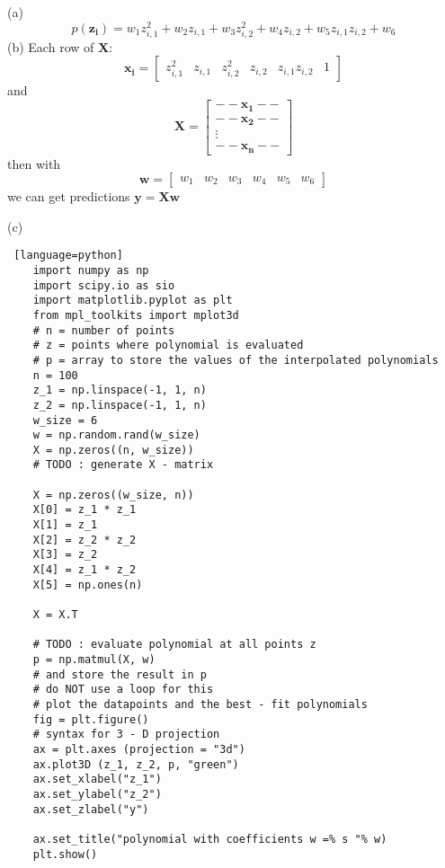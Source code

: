 \documentclass[a4paper, 12pt]{article}
\begin{document}
\begin{problem}

\end{problem}
\begin{solution}
    (a) \[
        p(\mathbf{z_i}) = w_1z_{i, 1}^2 + w_2 z_{i, 1} + w_3 z_{i, 2}^2 + w_4 z_{i, 2} + w_5 z_{i,1}z_{i,2} + w_6
    \]
    (b)
    Each row of $\mathbf{X}$:
    \[
        \mathbf{x_i} = \begin{bmatrix}
            z_{i, 1}^2 & z_{i, 1} & z_{i, 2}^2 & z_{i, 2} & z_{i,1}z_{i,2} & 1
        \end{bmatrix}
    \]
    and \[
    \mathbf{X} = \begin{bmatrix}
        -- \mathbf{x_1} -- \\
        -- \mathbf{x_2} -- \\
        \vdots \\
        -- \mathbf{x_n} --
    \end{bmatrix}
    \]
    then with \[
    \mathbf{w} = \begin{bmatrix}
    w_1 & w_2 & w_3 & w_4 & w_5 & w_6
    \end{bmatrix}
    \]
    we can get predictions $\mathbf{y} = \mathbf{Xw}$

    (c)
    \begin{lstlisting} [language=python]
    import numpy as np
    import scipy.io as sio
    import matplotlib.pyplot as plt
    from mpl_toolkits import mplot3d
    # n = number of points
    # z = points where polynomial is evaluated
    # p = array to store the values of the interpolated polynomials
    n = 100
    z_1 = np.linspace(-1, 1, n)
    z_2 = np.linspace(-1, 1, n)
    w_size = 6
    w = np.random.rand(w_size)
    X = np.zeros((n, w_size))
    # TODO : generate X - matrix
    
    X = np.zeros((w_size, n))
    X[0] = z_1 * z_1
    X[1] = z_1
    X[2] = z_2 * z_2
    X[3] = z_2
    X[4] = z_1 * z_2
    X[5] = np.ones(n)
    
    X = X.T
        
    # TODO : evaluate polynomial at all points z
    p = np.matmul(X, w)
    # and store the result in p
    # do NOT use a loop for this
    # plot the datapoints and the best - fit polynomials
    fig = plt.figure()
    # syntax for 3 - D projection
    ax = plt.axes (projection = "3d")
    ax.plot3D (z_1, z_2, p, "green")
    ax.set_xlabel("z_1")
    ax.set_ylabel("z_2")
    ax.set_zlabel("y")
    
    ax.set_title("polynomial with coefficients w =% s "% w)
    plt.show()
    \end{lstlisting}
\end{solution}
\end{document}
